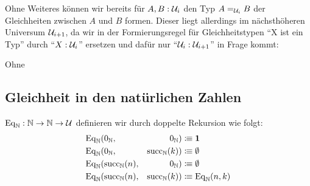 Ohne Weiteres können wir bereits für $A,B:\mU_i$ den Typ $A=_{\mU_i}B$ der Gleichheiten zwischen $A$ und $B$ formen.
Dieser liegt allerdings im nächsthöheren Universum $\mU_{i+1}$, da wir in der Formierungsregel für Gleichheitstypen ``X ist ein Typ'' durch ``$X : \mU_i$'' ersetzen und dafür nur ``$\mU_i : \mU_{i+1}$'' in Frage kommt:
\begin{mathpar}
\end{mathpar}

Ohne 


\subsection{Gleichheit in den natürlichen Zahlen}
\label{sec:zahlen-gleichheit}
\begin{definition}
  $\Eq{\N}:\N\to\N\to\mU$ definieren wir durch doppelte Rekursion wie folgt:
  \begin{align*}
    &\Eq{\N}(0_\N,    &0_\N)    &\colonequiv\einheit \\
    &\Eq{\N}(0_\N,    &\sucN(k))&\colonequiv\leer \\
    &\Eq{\N}(\sucN(n),&0_\N)    &\colonequiv\leer \\
    &\Eq{\N}(\sucN(n),&\sucN(k))&\colonequiv\Eq{\N}(n,k) 
  \end{align*}
\end{definition}
